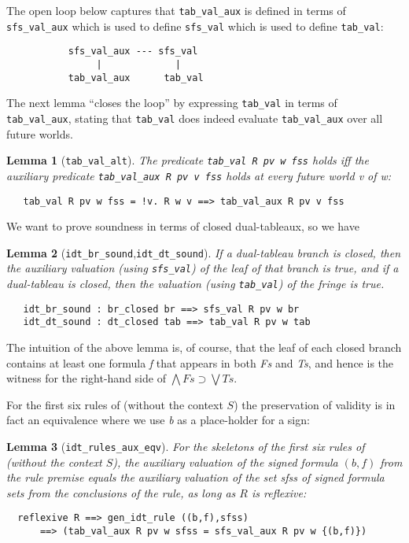 \documentclass[a4paper]{article}
\newtheorem{lemma}{Lemma}
\begin{document}
The open loop below captures that \texttt{tab\_val\_aux} is defined in
terms of \texttt{sfs\_val\_aux} which is used to define
\texttt{sfs\_val} which is used to define \texttt{tab\_val}:
\begin{verbatim}
           sfs_val_aux --- sfs_val
                |             |
           tab_val_aux      tab_val
\end{verbatim}
The next lemma ``closes the loop'' by expressing \texttt{tab\_val} in terms of
\texttt{tab\_val\_aux}, stating that \texttt{tab\_val} does indeed
evaluate \texttt{tab\_val\_aux} over all future worlds.

\begin{lemma}[\texttt{tab\_val\_alt}]
The predicate \texttt{tab\_val R pv w fss} holds iff 
the auxiliary predicate \texttt{tab\_val\_aux R pv v fss} holds at
every future world \textit{v} of \textit{w}:
\begin{verbatim}
   tab_val R pv w fss = !v. R w v ==> tab_val_aux R pv v fss
\end{verbatim}
\end{lemma}

We want to prove soundness in terms of closed dual-tableaux, so we have

\begin{lemma}[\texttt{idt\_br\_sound},\texttt{idt\_dt\_sound}]
\label{idt-br-sound} \label{idt-dt-sound}
  If a dual-tableau branch is closed, then the auxiliary valuation (using
  \texttt{sfs\_val}) of the leaf of that branch is true, and if a
  dual-tableau is closed, then the valuation (using
  \texttt{tab\_val}) of the fringe is true.
\end{lemma}
\begin{verbatim}
   idt_br_sound : br_closed br ==> sfs_val R pv w br
   idt_dt_sound : dt_closed tab ==> tab_val R pv w tab
\end{verbatim}

The intuition of the above lemma is, of course, that the leaf of
each closed branch contains at least one formula \textit{f} that
appears in both \textit{Fs} and \textit{Ts}, and hence is the witness
for the right-hand side of $\bigwedge \mathit{Fs} \supset \bigvee \mathit{Ts}$.

For the first six rules of \cite[Figure~1.6]{fitting-dual-tableau}
(without the context $S$)
the preservation of validity is in fact an equivalence where we use
\textit{b} as a place-holder for a sign:

\begin{lemma}[\texttt{idt\_rules\_aux\_eqv}] \label{idt-rules-aux-equiv}
  For the skeletons of the first six rules of 
  \cite[Figure~1.6]{fitting-dual-tableau} (without the context $S$),
  the auxiliary valuation of the signed formula
  $(b, f)$ from the rule premise equals the auxiliary
  valuation of the set  \textit{sfss} of signed formula sets from the
  conclusions of the rule, as long as $R$ is reflexive:
\end{lemma}
\begin{verbatim}
  reflexive R ==> gen_idt_rule ((b,f),sfss) 
      ==> (tab_val_aux R pv w sfss = sfs_val_aux R pv w {(b,f)})
\end{verbatim}
\end{document}
